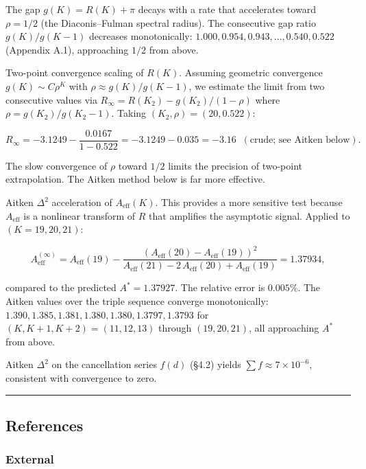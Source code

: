 \documentclass[
  11pt,
]{article}
\begin{document}
The gap \(g(K) = R(K) + \pi\) decays with a rate that accelerates toward
\(\rho = 1/2\) (the Diaconis--Fulman spectral radius). The consecutive gap ratio
\(g(K)/g(K-1)\) decreases monotonically:
\(1.000, 0.954, 0.943, \ldots, 0.540, 0.522\) (Appendix A.1), approaching
\(1/2\) from above.

Two-point convergence scaling of \(R(K)\). Assuming geometric convergence
\(g(K) \sim C \rho^K\) with \(\rho \approx g(K)/g(K-1)\), we estimate the limit
from two consecutive values via \(R_\infty = R(K_2) - g(K_2)/(1 - \rho)\) where
\(\rho = g(K_2)/g(K_2-1)\). Taking \((K_2, \rho) = (20, 0.522)\):

\[R_\infty = -3.1249 - \frac{0.0167}{1 - 0.522} = -3.1249 - 0.035 = -3.16 \;\;(\text{crude; see Aitken below}).\]

The slow convergence of \(\rho\) toward \(1/2\) limits the precision of
two-point extrapolation. The Aitken method below is far more effective.

Aitken \(\Delta^2\) acceleration of \(A_{\mathrm{eff}}(K)\). This provides a
more sensitive test because \(A_{\mathrm{eff}}\) is a nonlinear transform of
\(R\) that amplifies the asymptotic signal. Applied to \((K = 19, 20, 21)\):

\[A_{\mathrm{eff}}^{(\infty)} = A_{\mathrm{eff}}(19) - \frac{(A_{\mathrm{eff}}(20) - A_{\mathrm{eff}}(19))^2}{A_{\mathrm{eff}}(21) - 2\,A_{\mathrm{eff}}(20) + A_{\mathrm{eff}}(19)} = 1.37934,\]

compared to the predicted \(A^{\ast} = 1.37927\). The relative error is
\(0.005\%\). The Aitken values over the triple sequence converge monotonically:
\(1.390, 1.385, 1.381, 1.380, 1.380, 1.3797, 1.3793\) for
\((K, K+1, K+2) = (11,12,13)\) through \((19,20,21)\), all approaching
\(A^{\ast}\) from above.

Aitken \(\Delta^2\) on the cancellation series \(f(d)\) (§4.2) yields
\(\sum f \approx 7 \times 10^{-6}\), consistent with convergence to zero.

\begin{center}\rule{0.5\linewidth}{0.5pt}\end{center}

\newpage

\subsection{References}\label{references}

\subsubsection{External}\label{external}
\end{document}

